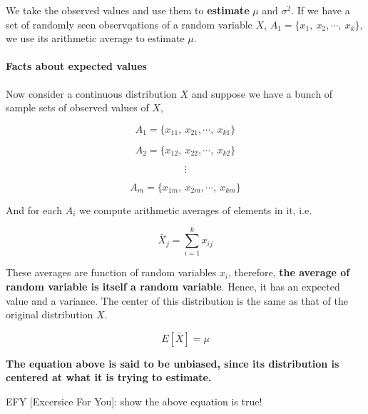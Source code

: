 \documentclass[11pt]{article}
\begin{document}
We take the observed values and use them to \textbf{estimate} $\mu$
and $\sigma^2$. If we have a set of randomly seen observqations of a
random variable $X$, $A_1 = \{x_1, \: x_2, \cdots, \: x_k\}$, we use its
arithmetic average to estimate $\mu$.

    \paragraph{Facts about expected
values}\label{facts-about-expected-values}

Now consider a continuous distribution $X$ and suppose we have a bunch
of sample sets of observed values of $X$,

\[A_1 =\{x_{11}, \:  x_{21}, \cdots, \: x_{k1}\}\]

\[A_2 =\{x_{12}, \: x_{22}, \cdots, \: x_{k2}\}\]

\[\vdots\]

\[A_m =\{x_{1m}, \: x_{2m}, \cdots, \: x_{km}\}\]

And for each $A_i$ we compute arithmetic averages of elements in it,
i.e.

\[\bar{X}_j = \sum_{i=1}^{k}x_{ij} \tag{1}\]

These averages are function of random variables $x_i$, therefore,
\textbf{the average of random variable is itself a random variable}.
Hence, it has an expected value and a variance. The center of this
distribution is the same as that of the original distribution $X$.

\textbf{\[E[\bar{X}] = \mu \tag{important fact 2}\]}

\textbf{The equation above is said to be unbiased, since its
distribution is centered at what it is trying to estimate.}

EFY {[}Excersice For You{]}: show the above equation is true!
\end{document}
